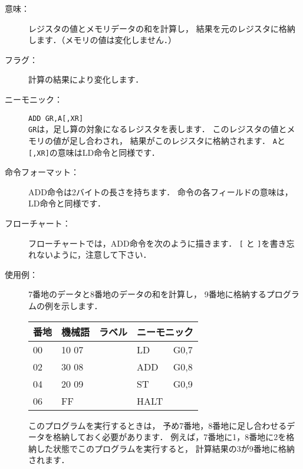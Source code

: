 \begin{description}
\item[意味：]レジスタの値とメモリデータの和を計算し，
結果を元のレジスタに格納します．（メモリの値は変化しません．）

\item[フラグ：]計算の結果により変化します．

\item[ニーモニック：]{\tt ADD  GR,A[,XR]} \\
{\tt GR}は，足し算の対象になるレジスタを表します．
このレジスタの値とメモリの値が足し合わされ，
結果がこのレジスタに格納されます．
{\tt A}と{\tt [,XR]}の意味はLD命令と同様です．

\item[命令フォーマット：]ADD命令は2バイトの長さを持ちます．
命令の各フィールドの意味は，LD命令と同様です．


\item[フローチャート：]フローチャートでは，ADD命令を次のように描きます．
{\tt [} と {\tt ]}を書き忘れないように，注意して下さい．

\begin{center}
\end{center}

\item[使用例：]
7番地のデータと8番地のデータの和を計算し，
9番地に格納するプログラムの例を示します．

{\tt\small\begin{center}
\begin{tabular}{|l|l|l|l l|} \hline
番地 & 機械語 & ラベル & \multicolumn{2}{|c|}{ニーモニック} \\
\hline
00 & 10 07 & & LD   & G0,7 \\
02 & 30 08 & & ADD  & G0,8 \\
04 & 20 09 & & ST   & G0,9 \\
06 & FF    & & HALT & \\
\hline
\end{tabular}
\end{center}}

このプログラムを実行するときは，
予め7番地，8番地に足し合わせるデータを格納しておく必要があります．
例えば，7番地に1，8番地に2を格納した状態でこのプログラムを実行すると，
計算結果の3が9番地に格納されます．
\end{description}

